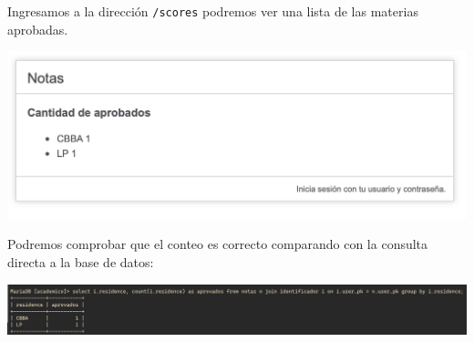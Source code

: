 \documentclass[letter]{article}
\begin{document}
Ingresamos a la dirección \texttt{/scores} podremos ver una lista de las materias aprobadas.

\begin{center}
\includegraphics[width=.9\linewidth]{./img/score.png}
\end{center}

Podremos comprobar que el conteo es correcto comparando con la consulta directa
a la base de datos:

\begin{center}
\includegraphics[width=.9\linewidth]{./img/scoredb.png}
\end{center}
\end{document}
